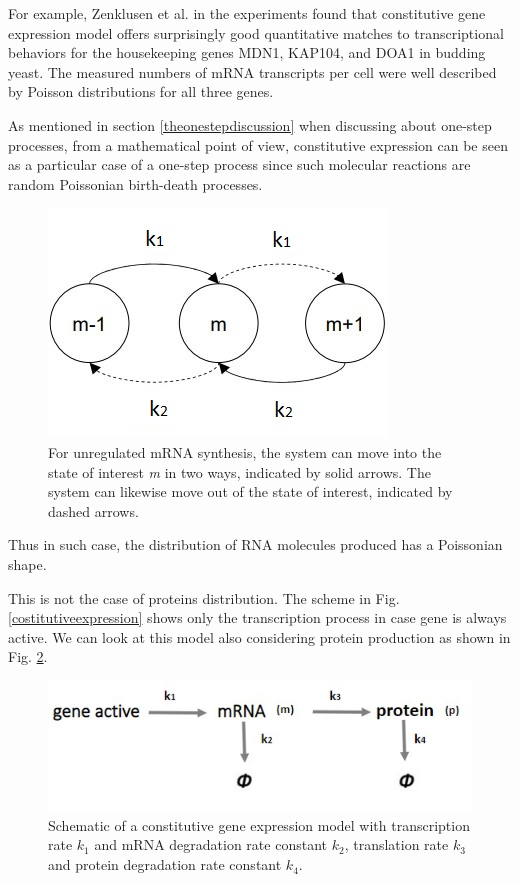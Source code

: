 \documentclass[12pt,a4paper]{report}
\begin{document}
For example, Zenklusen et al. in the experiments \cite{yeastexperiments} found that constitutive gene expression model offers surprisingly good quantitative matches to transcriptional behaviors for the housekeeping genes MDN1, KAP104, and DOA1 in budding yeast. The measured numbers of mRNA transcripts per cell were well described by Poisson distributions for all three genes.

As mentioned in section \ref{theonestepdiscussion} when discussing about one-step processes, from a mathematical point of view, constitutive expression can be seen as a particular case of a one-step process since such molecular reactions are random Poissonian birth-death processes. 

\begin{figure}[!ht]
\centering
\includegraphics[scale=0.64]{theonestepRNA.jpg}
\caption{For unregulated mRNA synthesis, the system can move into the
state of interest \emph{m} in two ways, indicated by solid arrows. The system can
likewise move out of the state of interest, indicated by dashed arrows.}
\label{theonestepRNA}
\end{figure}

Thus in such case, the distribution of RNA molecules produced has a Poissonian shape.

This is not the case of proteins distribution. The scheme in Fig. \ref{costitutiveexpression} shows only the transcription process in case gene is always active. We can look at this model also considering protein production as shown in Fig. \ref{proteincostitutiveexpression}.

\begin{figure}[!ht]
\centering
\includegraphics[scale=0.64]{proteincostitutiveexpression.jpg}
\caption{Schematic of a constitutive gene expression model with transcription rate $k_{1}$ and mRNA degradation rate constant $k_{2}$, translation rate $k_{3}$ and protein degradation rate constant $k_{4}$.}
\label{proteincostitutiveexpression}
\end{figure}
\end{document}
